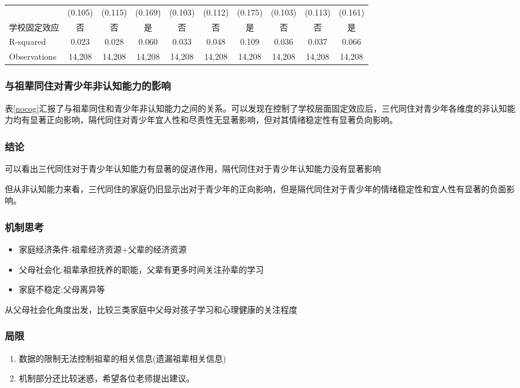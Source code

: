 \documentclass{beamer}
\begin{document}
\begin{frame}
\begin{table}[!htbp]
{\begin{tabular}{lccccccccc}
             & (0.105)    & (0.115)    & (0.169)    & (0.103)    & (0.112)    & (0.175)   & (0.103)    & (0.113)    & (0.161)    \\
学校固定效应       & 否          & 否          & 是          & 否          & 否          & 是         & 否          & 否          & 是          \\
R-squared    & 0.023      & 0.028      & 0.060      & 0.033      & 0.048      & 0.109     & 0.036      & 0.037      & 0.066      \\
Observations & 14,208     & 14,208     & 14,208     & 14,208     & 14,208     & 14,208    & 14,208     & 14,208     & 14,208   \\
\hline
\end{tabular}} %
\end{table}	
\end{frame}

\begin{frame}
	\frametitle{与祖辈同住对青少年非认知能力的影响}
表\ref{nocog}汇报了与祖辈同住和青少年非认知能力之间的关系。可以发现在控制了学校层面固定效应后，三代同住对青少年各维度的非认知能力均有显著正向影响，隔代同住对青少年宜人性和尽责性无显著影响，但对其情绪稳定性有显著负向影响。
\end{frame}


\begin{frame}
	\frametitle{结论}
可以看出三代同住对于青少年认知能力有显著的促进作用，隔代同住对于青少年认知能力没有显著影响
\par 但从非认知能力来看，三代同住的家庭仍旧显示出对于青少年的正向影响，但是隔代同住对于青少年的情绪稳定性和宜人性有显著的负面影响。

\end{frame}



\begin{frame}
	\frametitle{机制思考}
	\begin{itemize}
		\item 家庭经济条件:祖辈经济资源+父辈的经济资源
		\item 父母社会化:祖辈承担抚养的职能，父辈有更多时间关注孙辈的学习
		\item 家庭不稳定:父母离异等
	\end{itemize}
	从父母社会化角度出发，比较三类家庭中父母对孩子学习和心理健康的关注程度
\end{frame}




\begin{frame}
	\frametitle{局限}
	\begin{enumerate}
		\item 数据的限制无法控制祖辈的相关信息(遗漏祖辈相关信息)
		\item 机制部分还比较迷惑，希望各位老师提出建议。
	\end{enumerate}
\end{frame}
\end{document}
